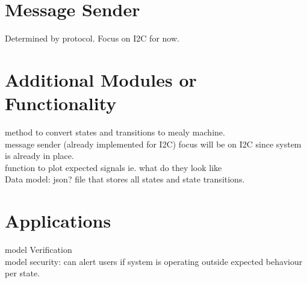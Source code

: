 \documentclass[11pt, a4paper]{article}
\begin{document}
\section*{Message Sender}
Determined by protocol.
Focus on I2C for now.

\section*{Additional Modules or Functionality}
method to convert states and transitions to mealy machine.\\
message sender (already implemented for I2C)
focus will be on I2C since system is already in place.\\
function to plot expected signals ie. what do they look like\\

Data model: json? file that stores all states and state transitions.\\

\section*{Applications}
model Verification\\
model security: can alert users if system is operating outside expected behaviour per state.\\
\end{document}
